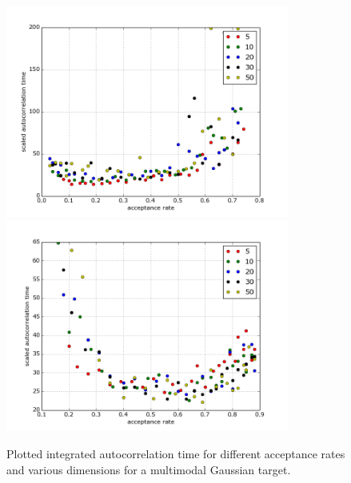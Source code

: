 \begin{figure}%
 \begin{center} 
  \includegraphics[width=0.83\textwidth]{RWM_ScaledAutocorrelationsDiagramm_MultimodalGaussian-m=2}
  \vspace*{1mm}
  \label{fig:OptimalScaling-RWM-dimensions}
  \vspace*{3mm}
  \includegraphics[width=0.83\textwidth]{MALA_ScaledAutocorrelationsDiagramm_MultimodalGaussian-m=2}
  \vspace*{1mm}
  \label{fig:OptimalScaling-MALA-dimensions}
 \end{center}
  \caption{Plotted integrated autocorrelation time for different acceptance rates and various dimensions for a multimodal Gaussian target.}
  \label{fig:OptimalScaling for RWM and MALA in various dimensions}
\end{figure}


